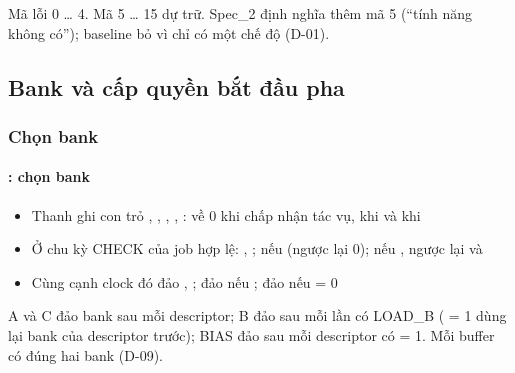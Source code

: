 \documentclass[10pt,a4paper]{article}
\begin{document}
\begin{notebox}
Mã lỗi 0 … 4. Mã 5 … 15 dự trữ. Spec\_2 định nghĩa thêm mã 5 (“tính năng không có”); baseline bỏ vì chỉ có một chế độ (D-01).
\end{notebox}

\subsection{Bank và cấp quyền bắt đầu pha}\label{sec:6}

\subsubsection{Chọn bank}\label{sec:6.1}

\paragraph{: chọn bank}\label{par:6-1}
\begin{itemize}
\item Thanh ghi con trỏ , , , , : về 0 khi chấp nhận tác vụ, khi  và khi 
\item Ở chu kỳ CHECK của job hợp lệ: , ;  nếu  (ngược lại 0);  nếu , ngược lại  và 
\item Cùng cạnh clock đó đảo , ; đảo  nếu ; đảo  nếu  = 0
\end{itemize}

\begin{notebox}
A và C đảo bank sau mỗi descriptor; B đảo sau mỗi lần có LOAD\_B ( = 1 dùng lại bank của descriptor trước); BIAS đảo sau mỗi descriptor có  = 1. Mỗi buffer có đúng hai bank (D-09).
\end{notebox}
\end{document}
